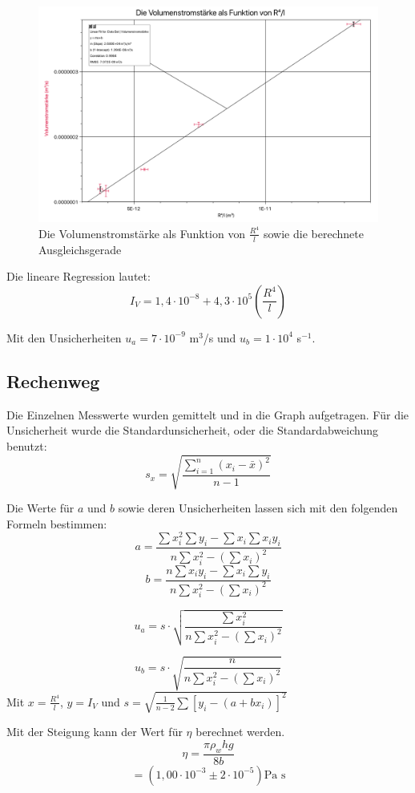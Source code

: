 \documentclass[11pt,a4paper]{article}
\begin{document}
\begin{figure}    
	\centering
	\includegraphics[width=\linewidth]{Abb2}
	\caption{Die Volumenstromstärke als Funktion von $\frac{R^4}{l}$ sowie die berechnete Ausgleichsgerade}
\end{figure}

Die lineare Regression lautet:
$$ I_V = 1,4\cdot 10^{-8} + 4,3 \cdot10^{5} (\frac{R^4}{l})$$

Mit den Unsicherheiten $u_a = 7\cdot 10^{-9}$ m$^3$/s und $u_b =1 \cdot 10^{4}$ s$^{-1}$. 

\begin{tcolorbox}[colback=white]
	\subsection{Rechenweg}
	Die Einzelnen Messwerte wurden gemittelt und in die Graph aufgetragen. Für die Unsicherheit wurde die Standardunsicherheit, oder die Standardabweichung benutzt:
	$$s_x = \sqrt{\frac{\sum_{i=1}^{n}(x_i-\bar{x})^2}{n-1}} $$
	
	Die Werte für $a$ und $b$ sowie deren Unsicherheiten lassen sich mit den folgenden Formeln bestimmen:
	$$a = \frac{
	\sum x_i^2 \sum y_i - \sum x_i \sum x_iy_i
}{
n \sum x_i^2 - (\sum x_i)^2
}$$
$$ b = \frac{
n\sum x_iy_i-\sum x_i \sum y_i
}{
n \sum x_i^2 - (\sum x_i)^2
}$$

$$u_a = s\cdot \sqrt{
\frac{
\sum x_i^2
}{
n\sum x_i^2 - (\sum x_i)^2
}}$$

$$u_b = s\cdot \sqrt{
\frac{
n
}{
n\sum x_i^2 - (\sum x_i)^2
}}$$
Mit $x = \frac{R^4}{l}$, $y = I_V$ und $s = \sqrt{
\frac{1}{n-2}\sum [y_i-(a+bx_i)]^2}$
\end{tcolorbox}

Mit der Steigung kann der Wert für $\eta$ berechnet werden. 
$$\eta = \frac{\pi \rho_w hg}{8b}$$
$$ = (1,00 \cdot 10^{-3} \pm 2\cdot10^{-5}) \textrm{Pa s} $$
\end{document}
